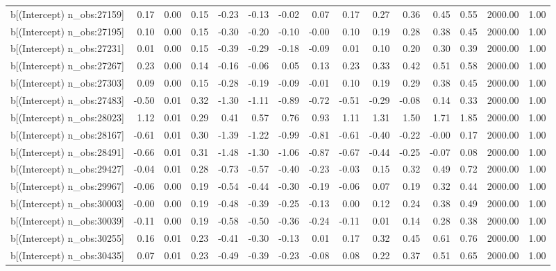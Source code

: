 \begin{table}[ht]
\begin{tabular}{rrrrrrrrrrrrrrr}
  b[(Intercept) n\_obs:27159] & 0.17 & 0.00 & 0.15 & -0.23 & -0.13 & -0.02 & 0.07 & 0.17 & 0.27 & 0.36 & 0.45 & 0.55 & 2000.00 & 1.00 \\ 
  b[(Intercept) n\_obs:27195] & 0.10 & 0.00 & 0.15 & -0.30 & -0.20 & -0.10 & -0.00 & 0.10 & 0.19 & 0.28 & 0.38 & 0.45 & 2000.00 & 1.00 \\ 
  b[(Intercept) n\_obs:27231] & 0.01 & 0.00 & 0.15 & -0.39 & -0.29 & -0.18 & -0.09 & 0.01 & 0.10 & 0.20 & 0.30 & 0.39 & 2000.00 & 1.00 \\ 
  b[(Intercept) n\_obs:27267] & 0.23 & 0.00 & 0.14 & -0.16 & -0.06 & 0.05 & 0.13 & 0.23 & 0.33 & 0.42 & 0.51 & 0.58 & 2000.00 & 1.00 \\ 
  b[(Intercept) n\_obs:27303] & 0.09 & 0.00 & 0.15 & -0.28 & -0.19 & -0.09 & -0.01 & 0.10 & 0.19 & 0.29 & 0.38 & 0.45 & 2000.00 & 1.00 \\ 
  b[(Intercept) n\_obs:27483] & -0.50 & 0.01 & 0.32 & -1.30 & -1.11 & -0.89 & -0.72 & -0.51 & -0.29 & -0.08 & 0.14 & 0.33 & 2000.00 & 1.00 \\ 
  b[(Intercept) n\_obs:28023] & 1.12 & 0.01 & 0.29 & 0.41 & 0.57 & 0.76 & 0.93 & 1.11 & 1.31 & 1.50 & 1.71 & 1.85 & 2000.00 & 1.00 \\ 
  b[(Intercept) n\_obs:28167] & -0.61 & 0.01 & 0.30 & -1.39 & -1.22 & -0.99 & -0.81 & -0.61 & -0.40 & -0.22 & -0.00 & 0.17 & 2000.00 & 1.00 \\ 
  b[(Intercept) n\_obs:28491] & -0.66 & 0.01 & 0.31 & -1.48 & -1.30 & -1.06 & -0.87 & -0.67 & -0.44 & -0.25 & -0.07 & 0.08 & 2000.00 & 1.00 \\ 
  b[(Intercept) n\_obs:29427] & -0.04 & 0.01 & 0.28 & -0.73 & -0.57 & -0.40 & -0.23 & -0.03 & 0.15 & 0.32 & 0.49 & 0.72 & 2000.00 & 1.00 \\ 
  b[(Intercept) n\_obs:29967] & -0.06 & 0.00 & 0.19 & -0.54 & -0.44 & -0.30 & -0.19 & -0.06 & 0.07 & 0.19 & 0.32 & 0.44 & 2000.00 & 1.00 \\ 
  b[(Intercept) n\_obs:30003] & -0.00 & 0.00 & 0.19 & -0.48 & -0.39 & -0.25 & -0.13 & 0.00 & 0.12 & 0.24 & 0.38 & 0.49 & 2000.00 & 1.00 \\ 
  b[(Intercept) n\_obs:30039] & -0.11 & 0.00 & 0.19 & -0.58 & -0.50 & -0.36 & -0.24 & -0.11 & 0.01 & 0.14 & 0.28 & 0.38 & 2000.00 & 1.00 \\ 
  b[(Intercept) n\_obs:30255] & 0.16 & 0.01 & 0.23 & -0.41 & -0.30 & -0.13 & 0.01 & 0.17 & 0.32 & 0.45 & 0.61 & 0.76 & 2000.00 & 1.00 \\ 
  b[(Intercept) n\_obs:30435] & 0.07 & 0.01 & 0.23 & -0.49 & -0.39 & -0.23 & -0.08 & 0.08 & 0.22 & 0.37 & 0.51 & 0.65 & 2000.00 & 1.00 \\ 

\end{tabular}
\end{table}
